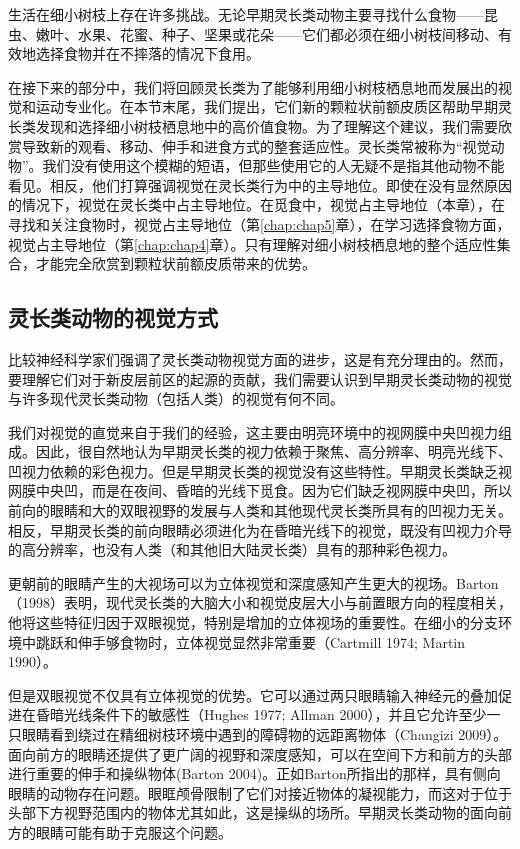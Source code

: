 生活在细小树枝上存在许多挑战。无论早期灵长类动物主要寻找什么食物——昆虫、嫩叶、水果、花蜜、种子、坚果或花朵——它们都必须在细小树枝间移动、有效地选择食物并在不摔落的情况下食用。

在接下来的部分中，我们将回顾灵长类为了能够利用细小树枝栖息地而发展出的视觉和运动专业化。在本节末尾，我们提出，它们新的颗粒状前额皮质区帮助早期灵长类发现和选择细小树枝栖息地中的高价值食物。为了理解这个建议，我们需要欣赏导致新的观看、移动、伸手和进食方式的整套适应性。灵长类常被称为“视觉动物”。我们没有使用这个模糊的短语，但那些使用它的人无疑不是指其他动物不能看见。相反，他们打算强调视觉在灵长类行为中的主导地位。即使在没有显然原因的情况下，视觉在灵长类中占主导地位。在觅食中，视觉占主导地位（本章），在寻找和关注食物时，视觉占主导地位（第\ref{chap:chap5}章），在学习选择食物方面，视觉占主导地位（第\ref{chap:chap4}章）。只有理解对细小树枝栖息地的整个适应性集合，才能完全欣赏到颗粒状前额皮质带来的优势。

\subsection{灵长类动物的视觉方式}
比较神经科学家们强调了灵长类动物视觉方面的进步，这是有充分理由的。然而，要理解它们对于新皮层前区的起源的贡献，我们需要认识到早期灵长类动物的视觉与许多现代灵长类动物（包括人类）的视觉有何不同。

我们对视觉的直觉来自于我们的经验，这主要由明亮环境中的视网膜中央凹视力组成。因此，很自然地认为早期灵长类的视力依赖于聚焦、高分辨率、明亮光线下、凹视力依赖的彩色视力。但是早期灵长类的视觉没有这些特性。早期灵长类缺乏视网膜中央凹，而是在夜间、昏暗的光线下觅食。因为它们缺乏视网膜中央凹，所以前向的眼睛和大的双眼视野的发展与人类和其他现代灵长类所具有的凹视力无关。相反，早期灵长类的前向眼睛必须进化为在昏暗光线下的视觉，既没有凹视力介导的高分辨率，也没有人类（和其他旧大陆灵长类）具有的那种彩色视力。

更朝前的眼睛产生的大视场可以为立体视觉和深度感知产生更大的视场。Barton（1998）表明，现代灵长类的大脑大小和视觉皮层大小与前置眼方向的程度相关，他将这些特征归因于双眼视觉，特别是增加的立体视场的重要性。在细小的分支环境中跳跃和伸手够食物时，立体视觉显然非常重要（Cartmill 1974; Martin 1990）。

但是双眼视觉不仅具有立体视觉的优势。它可以通过两只眼睛输入神经元的叠加促进在昏暗光线条件下的敏感性（Hughes 1977; Allman 2000），并且它允许至少一只眼睛看到绕过在精细树枝环境中遇到的障碍物的远距离物体（Changizi 2009）。面向前方的眼睛还提供了更广阔的视野和深度感知，可以在空间下方和前方的头部进行重要的伸手和操纵物体(Barton 2004)。正如Barton所指出的那样，具有侧向眼睛的动物存在问题。眼眶颅骨限制了它们对接近物体的凝视能力，而这对于位于头部下方视野范围内的物体尤其如此，这是操纵的场所。早期灵长类动物的面向前方的眼睛可能有助于克服这个问题。

